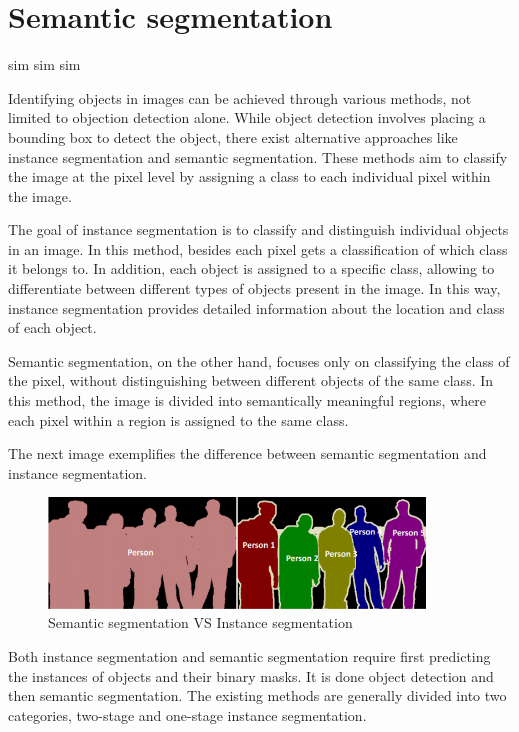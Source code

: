 

\chapter{Semantic segmentation}
\label{chapter:unet}

\begin{introduction}
sim sim  sim
\end{introduction}

Identifying objects in images can be achieved through various methods, not limited to objection detection alone. While object detection involves placing a bounding box to detect the object, there exist alternative approaches like instance segmentation and semantic segmentation. These methods aim to classify the image at the pixel level by assigning a class to each individual pixel within the image.

The goal of instance segmentation is to classify and distinguish individual objects in an image. In this method, besides each pixel gets a classification of which class it belongs to. In addition, each object is assigned to a specific class, allowing to differentiate between different types of objects present in the image. In this way, instance segmentation provides detailed information about the location and class of each object.

Semantic segmentation, on the other hand, focuses only on classifying the class of the pixel, without distinguishing between different objects of the same class. In this method, the image is divided into semantically meaningful regions, where each pixel within a region is assigned to the same class.

The next image exemplifies the difference between semantic segmentation and instance segmentation.

\begin{figure}[H]
\centering
\includegraphics[width=10cm]{images/semanticVSinstance.png}
\caption{Semantic segmentation VS Instance segmentation \cite{semanticvsinstance}}
\end{figure}


Both instance segmentation and semantic segmentation require first predicting the instances of objects and their binary masks. It is done object detection and then semantic segmentation. The existing methods are generally divided into two categories\cite{instayolo}, two-stage and one-stage instance segmentation.

